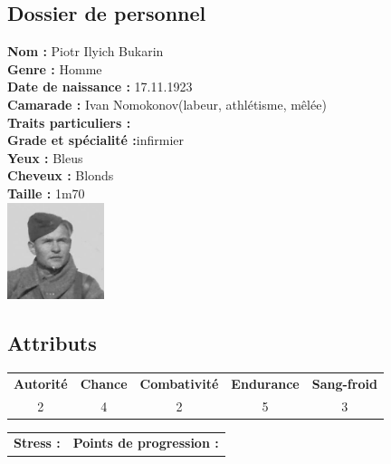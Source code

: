 \documentclass{report}
\begin{document}
\newpage
\ttfamily
\begin{center}
\section*{Dossier de personnel}
\begin{multicols}{3}
\textbf{Nom :} Piotr Ilyich Bukarin\\
\textbf{Genre :} Homme\\
\textbf{Date de naissance :} 17.11.1923\\
\textbf{Camarade :} Ivan Nomokonov(labeur, athlétisme, mêlée)\\
\textbf{Traits particuliers :}\\
\columnbreak
\textbf{Grade et spécialité :}infirmier \\
\textbf{Yeux :} Bleus\\
\textbf{Cheveux :} Blonds\\
\textbf{Taille :} 1m70\\
\columnbreak
\includegraphics[height=80pt]{piotr.jpg}
\end{multicols}
\end{center}
\noindent\makebox[\linewidth]{\rule{\textwidth}{0.4pt}}
\subsection*{Attributs}
\begin{center}
    \begin{tabular}{c|c|c|c|c}
        \textbf{Autorité} & \textbf{Chance} & \textbf{Combativité} & \textbf{Endurance} & \textbf{Sang-froid} \\
         2&4 &2 &5 &3\\

    \end{tabular}
\end{center}
\begin{tabular}{m{} m{}}
     \textbf{Stress :} & \textbf{Points de progression :}
\end{tabular}\\
\noindent\makebox[\linewidth]{\rule{\textwidth}{0.4pt}}
\end{document}
